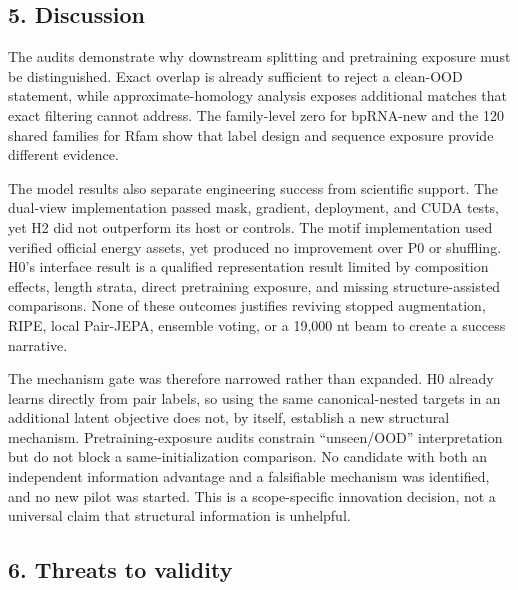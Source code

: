 \documentclass[
  11pt]{article}
\begin{document}
\hypertarget{5-discussion}{%
\subsection{5. Discussion}\label{5-discussion}}

The audits demonstrate why downstream splitting and pretraining exposure
must be distinguished. Exact overlap is already sufficient to reject a
clean-OOD statement, while approximate-homology analysis exposes
additional matches that exact filtering cannot address. The family-level
zero for bpRNA-new and the 120 shared families for Rfam show that label
design and sequence exposure provide different evidence.

The model results also separate engineering success from scientific
support. The dual-view implementation passed mask, gradient, deployment,
and CUDA tests, yet H2 did not outperform its host or controls. The
motif implementation used verified official energy assets, yet produced
no improvement over P0 or shuffling. H0's interface result is a
qualified representation result limited by composition effects, length
strata, direct pretraining exposure, and missing structure-assisted
comparisons. None of these outcomes justifies reviving stopped
augmentation, RIPE, local Pair-JEPA, ensemble voting, or a 19,000 nt
beam to create a success narrative.

The mechanism gate was therefore narrowed rather than expanded. H0
already learns directly from pair labels, so using the same
canonical-nested targets in an additional latent objective does not, by
itself, establish a new structural mechanism. Pretraining-exposure
audits constrain ``unseen/OOD'' interpretation but do not block a
same-initialization comparison. No candidate with both an independent
information advantage and a falsifiable mechanism was identified, and no
new pilot was started. This is a scope-specific innovation decision, not
a universal claim that structural information is unhelpful.

\hypertarget{6-threats-to-validity}{%
\subsection{6. Threats to validity}\label{6-threats-to-validity}}
\end{document}
